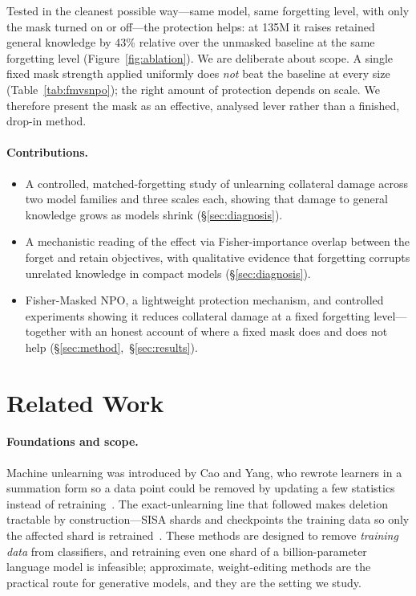 \documentclass[sigconf,nonacm]{acmart}
\begin{document}
Tested in the cleanest possible way---same model, same forgetting level, with only the mask turned on or off---the protection helps: at 135M it raises retained general knowledge by 43\% relative over the unmasked baseline at the same forgetting level (Figure~\ref{fig:ablation}). We are deliberate about scope. A single fixed mask strength applied uniformly does \emph{not} beat the baseline at every size (Table~\ref{tab:fmvsnpo}); the right amount of protection depends on scale. We therefore present the mask as an effective, analysed lever rather than a finished, drop-in method.

\paragraph{Contributions.}
\begin{itemize}
\item A controlled, matched-forgetting study of unlearning collateral damage across two model families and three scales each, showing that damage to general knowledge grows as models shrink (\S\ref{sec:diagnosis}).
\item A mechanistic reading of the effect via Fisher-importance overlap between the forget and retain objectives, with qualitative evidence that forgetting corrupts unrelated knowledge in compact models (\S\ref{sec:diagnosis}).
\item Fisher-Masked NPO, a lightweight protection mechanism, and controlled experiments showing it reduces collateral damage at a fixed forgetting level---together with an honest account of where a fixed mask does and does not help (\S\ref{sec:method},~\S\ref{sec:results}).
\end{itemize}

\section{Related Work}
\paragraph{Foundations and scope.}
Machine unlearning was introduced by Cao and Yang, who rewrote learners in a summation form so a data point could be removed by updating a few statistics instead of retraining~\cite{cao2015}. The exact-unlearning line that followed makes deletion tractable by construction---SISA shards and checkpoints the training data so only the affected shard is retrained~\cite{sisa}. These methods are designed to remove \emph{training data} from classifiers, and retraining even one shard of a billion-parameter language model is infeasible; approximate, weight-editing methods are the practical route for generative models, and they are the setting we study.
\end{document}
